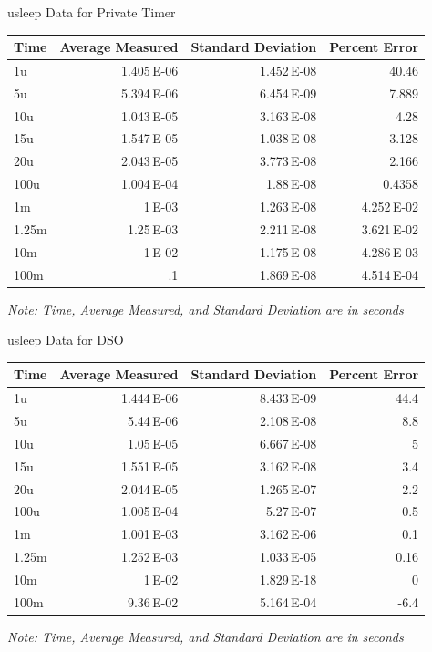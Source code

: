 \documentclass[pdf]{beamer}
\begin{document}
\begin{frame}{usleep Data for Private Timer}
  \begin{center}
    \begin{tabular}{lrrr}
      Time & Average Measured & Standard Deviation & Percent Error\\
      \hline
      1u & 1.405\,E-06 & 1.452\,E-08 & 40.46\\
      5u & 5.394\,E-06 & 6.454\,E-09 & 7.889\\
      10u & 1.043\,E-05 & 3.163\,E-08 & 4.28\\
      15u & 1.547\,E-05 & 1.038\,E-08 & 3.128\\
      20u & 2.043\,E-05 & 3.773\,E-08 & 2.166\\
      100u & 1.004\,E-04 & 1.88\,E-08 & 0.4358\\
      1m & 1\,E-03 & 1.263\,E-08 & 4.252\,E-02\\
      1.25m & 1.25\,E-03 & 2.211\,E-08 & 3.621\,E-02\\
      10m & 1\,E-02 & 1.175\,E-08 & 4.286\,E-03\\
      100m & .1 & 1.869\,E-08 & 4.514\,E-04\\
      \hline
    \end{tabular}
  \end{center}
  \small\emph{Note: Time, Average Measured, and Standard Deviation are in seconds}
\end{frame}

\begin{frame}{usleep Data for DSO}
  \begin{center}
    \begin{tabular}{lrrr}
      Time & Average Measured & Standard Deviation & Percent Error\\
      \hline
      1u & 1.444\,E-06 & 8.433\,E-09 & 44.4\\
      5u & 5.44\,E-06 & 2.108\,E-08 & 8.8\\
      10u & 1.05\,E-05 & 6.667\,E-08 & 5\\
      15u & 1.551\,E-05 & 3.162\,E-08 & 3.4\\
      20u & 2.044\,E-05 & 1.265\,E-07 & 2.2\\
      100u & 1.005\,E-04 & 5.27\,E-07 & 0.5\\
      1m & 1.001\,E-03 & 3.162\,E-06 & 0.1\\
      1.25m & 1.252\,E-03 & 1.033\,E-05 & 0.16\\
      10m & 1\,E-02 & 1.829\,E-18 & 0\\
      100m & 9.36\,E-02 & 5.164\,E-04 & -6.4\\
      \hline
    \end{tabular}
  \end{center}
  \small\emph{Note: Time, Average Measured, and Standard Deviation are in seconds}
\end{frame}
    
\end{document}
